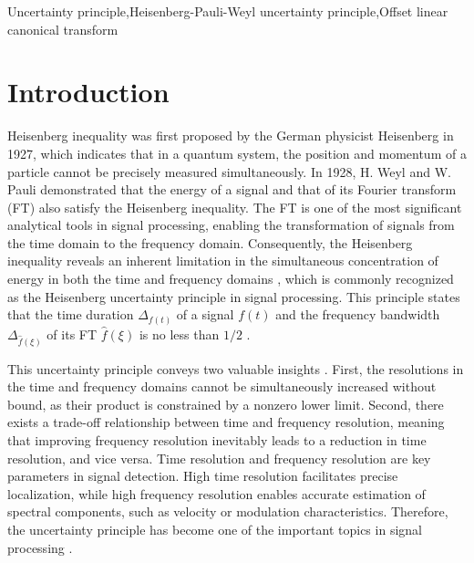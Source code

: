 \documentclass[preprint,12pt]{elsarticle}
\begin{document}
\begin{frontmatter}


\begin{keyword}
Uncertainty principle\sep Heisenberg-Pauli-Weyl uncertainty principle\sep Offset linear canonical transform
\end{keyword}

\end{frontmatter}

\section{Introduction}
\label{Intro}
Heisenberg inequality \cite{heisenberg,weyl,kennard} was first proposed by the German physicist Heisenberg in 1927, which indicates that in a quantum system, the position and momentum of a particle cannot be precisely measured simultaneously. In 1928, H. Weyl and W. Pauli demonstrated that the energy of a signal and that of its Fourier transform (FT) also satisfy the Heisenberg inequality. The FT \cite{FT,FT2,FT3} is one of the most significant analytical tools in signal processing, enabling the transformation of signals from the time domain to the frequency domain. Consequently, the Heisenberg inequality reveals an inherent limitation in the simultaneous concentration of energy in both the time and frequency domains \cite{HPW}, which is commonly recognized as the Heisenberg uncertainty principle in signal processing. This principle states that the time duration $\Delta_{f(t)}$ of a signal $f(t)$ and the frequency bandwidth $\Delta_{\hat{f}(\xi)}$ of its FT $\hat{f}(\xi)$ is no less than $1/2$ \cite{UN}.

This uncertainty principle conveys two valuable insights \cite{xu}. First, the resolutions in the time and frequency domains cannot be simultaneously increased without bound, as their product is constrained by a nonzero lower limit. Second, there exists a trade-off relationship between time and frequency resolution, meaning that improving frequency resolution inevitably leads to a reduction in time resolution, and vice versa. Time resolution and frequency resolution are key parameters in signal detection. High time resolution facilitates precise localization, while high frequency resolution enables accurate estimation of spectral components, such as velocity or modulation characteristics. Therefore, the uncertainty principle has become one of the important topics in signal processing \cite{UP1, UP2, UP3}. 
\end{document}
